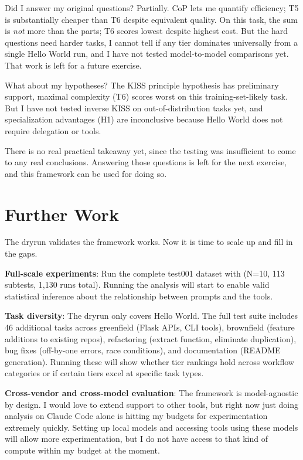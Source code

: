 \documentclass[11pt]{article}
\begin{document}
Did I answer my original questions? Partially. CoP lets me quantify efficiency;
T5 is substantially cheaper than T6 despite equivalent quality. On this task, the sum is
\emph{not} more than the parts; T6 scores lowest despite highest cost. But the hard
questions need harder tasks, I cannot tell if any tier dominates universally from
a single Hello World run, and I have not tested model-to-model comparisons yet.
That work is left for a future exercise.

What about my hypotheses? The KISS principle hypothesis has preliminary support, maximal complexity (T6) scores worst on this training-set-likely
task. But I have not tested inverse KISS on out-of-distribution tasks yet, and
specialization advantages (H1) are inconclusive because Hello World does not
require delegation or tools.

There is no real practical takeaway yet, since the testing was insufficient to
come to any real conclusions. Answering those questions is left for the next
exercise, and this framework can be used for doing so.

\section{Further Work}\label{sec:further}

The dryrun validates the framework works. Now it is time to scale up and fill in
the gaps.

\textbf{Full-scale experiments}: Run the complete test001 dataset with (N=10, 113
 subtests, 1,130 runs total). Running the analysis will start to enable valid
statistical inference about the relationship between prompts and the tools.

\textbf{Task diversity}: The dryrun only covers Hello World. The full test suite
includes 46 additional tasks across greenfield (Flask APIs, CLI tools),
brownfield (feature additions to existing repos), refactoring (extract function,
eliminate duplication), bug fixes (off-by-one errors, race conditions), and
documentation (README generation). Running these will show whether tier rankings
hold across workflow categories or if certain tiers excel at specific task
types.

\textbf{Cross-vendor and cross-model evaluation}: The framework is model-agnostic by
design. I would love to extend support to other tools, but right now just doing
analysis on Claude Code alone is hitting my budgets for experimentation
extremely quickly. Setting up local models and accessing tools using these
models will allow more experimentation, but I do not have access to that kind of
compute within my budget at the moment.
\end{document}
